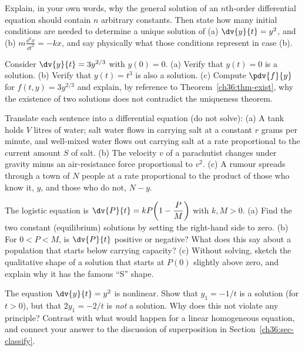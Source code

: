 \begin{exercise}
\label{ch36:ex-order1}
Explain, in your own words, why the general solution of an $n$th-order differential equation should contain $n$ arbitrary constants. Then state how many initial conditions are needed to determine a unique solution of (a) $\dv{y}{t} = y^2$, and (b) $m\frac{\dd^2 x}{\dd t^2} = -kx$, and say physically what those conditions represent in case (b).
\end{exercise}

\begin{exercise}
\label{ch36:ex-nonunique1}
Consider $\dv{y}{t} = 3y^{2/3}$ with $y(0) = 0$.
(a) Verify that $y(t) = 0$ is a solution.
(b) Verify that $y(t) = t^3$ is also a solution.
(c) Compute $\pdv{f}{y}$ for $f(t,y) = 3y^{2/3}$ and explain, by reference to Theorem~\ref{ch36:thm-exist}, why the existence of two solutions does not contradict the uniqueness theorem.
\end{exercise}

\begin{exercise}
\label{ch36:ex-model1}
Translate each sentence into a differential equation (do not solve):
(a) A tank holds $V$ litres of water; salt water flows in carrying salt at a constant $r$ grams per minute, and well-mixed water flows out carrying salt at a rate proportional to the current amount $S$ of salt.
(b) The velocity $v$ of a parachutist changes under gravity minus an air-resistance force proportional to $v^2$.
(c) A rumour spreads through a town of $N$ people at a rate proportional to the product of those who know it, $y$, and those who do not, $N - y$.
\end{exercise}

\begin{exercise}
\label{ch36:ex-logistic1}
The logistic equation is $\dv{P}{t} = kP\!\left(1 - \dfrac{P}{M}\right)$ with $k, M > 0$.
(a) Find the two constant (equilibrium) solutions by setting the right-hand side to zero.
(b) For $0 < P < M$, is $\dv{P}{t}$ positive or negative? What does this say about a population that starts below carrying capacity?
(c) Without solving, sketch the qualitative shape of a solution that starts at $P(0)$ slightly above zero, and explain why it has the famous ``S'' shape.
\end{exercise}

\begin{exercise}
\label{ch36:ex-superposition1}
The equation $\dv{y}{t} = y^2$ is nonlinear. Show that $y_1 = -1/t$ is a solution (for $t>0$), but that $2y_1 = -2/t$ is \emph{not} a solution. Why does this not violate any principle? Contrast with what would happen for a linear homogeneous equation, and connect your answer to the discussion of superposition in Section~\ref{ch36:sec-classify}.
\end{exercise}

